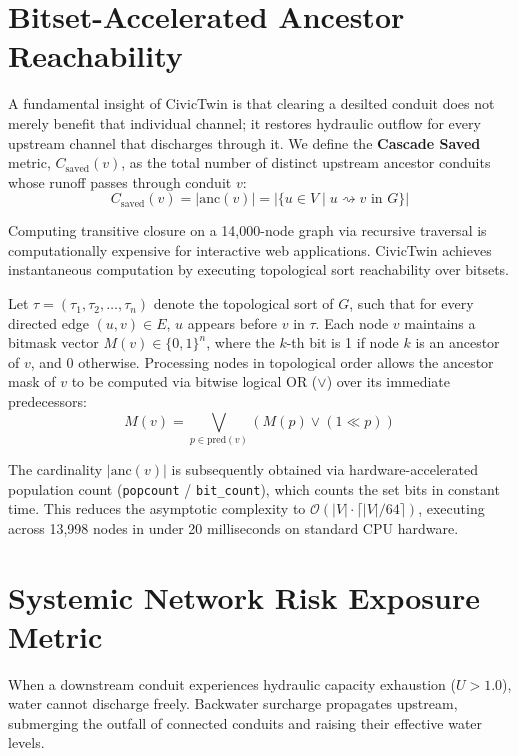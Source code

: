 \section{Bitset-Accelerated Ancestor Reachability}
A fundamental insight of CivicTwin is that clearing a desilted conduit does not merely benefit that individual channel; it restores hydraulic outflow for every upstream channel that discharges through it. We define the \textbf{Cascade Saved} metric, $C_{\text{saved}}(v)$, as the total number of distinct upstream ancestor conduits whose runoff passes through conduit $v$:
\begin{equation}
C_{\text{saved}}(v) = |\text{anc}(v)| = |\{u \in V \mid u \rightsquigarrow v \text{ in } G\}|
\label{eqn:cascade_saved}
\end{equation}

Computing transitive closure on a 14,000-node graph via recursive traversal is computationally expensive for interactive web applications. CivicTwin achieves instantaneous computation by executing topological sort reachability over bitsets. 

Let $\tau = (\tau_1, \tau_2, \dots, \tau_n)$ denote the topological sort of $G$, such that for every directed edge $(u, v) \in E$, $u$ appears before $v$ in $\tau$. Each node $v$ maintains a bitmask vector $M(v) \in \{0, 1\}^n$, where the $k$-th bit is 1 if node $k$ is an ancestor of $v$, and 0 otherwise. Processing nodes in topological order allows the ancestor mask of $v$ to be computed via bitwise logical OR ($\lor$) over its immediate predecessors:
\begin{equation}
M(v) = \bigvee_{p \in \text{pred}(v)} \left(M(p) \lor (1 \ll p)\right)
\label{eqn:bitset_or}
\end{equation}

The cardinality $|\text{anc}(v)|$ is subsequently obtained via hardware-accelerated population count (\texttt{popcount} / \texttt{bit\_count}), which counts the set bits in constant time. This reduces the asymptotic complexity to $\mathcal{O}(|V| \cdot \lceil |V| / 64 \rceil)$, executing across 13,998 nodes in under 20 milliseconds on standard CPU hardware.

\section{Systemic Network Risk Exposure Metric}
When a downstream conduit experiences hydraulic capacity exhaustion ($U > 1.0$), water cannot discharge freely. Backwater surcharge propagates upstream, submerging the outfall of connected conduits and raising their effective water levels. 

